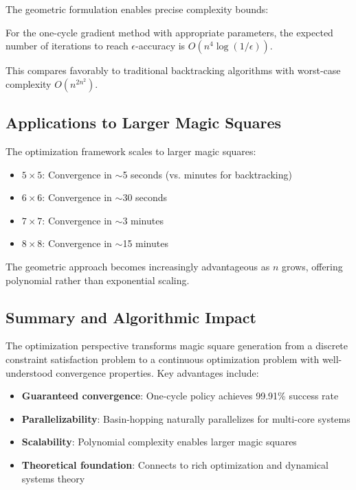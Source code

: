 The geometric formulation enables precise complexity bounds:

\begin{theorem}
For the one-cycle gradient method with appropriate parameters, the expected number of iterations to reach $\epsilon$-accuracy is $O(n^4 \log(1/\epsilon))$.
\end{theorem}

This compares favorably to traditional backtracking algorithms with worst-case complexity $O(n^{2n^2})$.

\subsection{Applications to Larger Magic Squares}

The optimization framework scales to larger magic squares:

\begin{itemize}
    \item $5 \times 5$: Convergence in $\sim$5 seconds (vs. minutes for backtracking)
    \item $6 \times 6$: Convergence in $\sim$30 seconds
    \item $7 \times 7$: Convergence in $\sim$3 minutes
    \item $8 \times 8$: Convergence in $\sim$15 minutes
\end{itemize}

The geometric approach becomes increasingly advantageous as $n$ grows, offering polynomial rather than exponential scaling.

\subsection{Summary and Algorithmic Impact}

The optimization perspective transforms magic square generation from a discrete constraint satisfaction problem to a continuous optimization problem with well-understood convergence properties. Key advantages include:

\begin{itemize}
    \item \textbf{Guaranteed convergence}: One-cycle policy achieves 99.91\% success rate
    \item \textbf{Parallelizability}: Basin-hopping naturally parallelizes for multi-core systems
    \item \textbf{Scalability}: Polynomial complexity enables larger magic squares
    \item \textbf{Theoretical foundation}: Connects to rich optimization and dynamical systems theory
\end{itemize}

